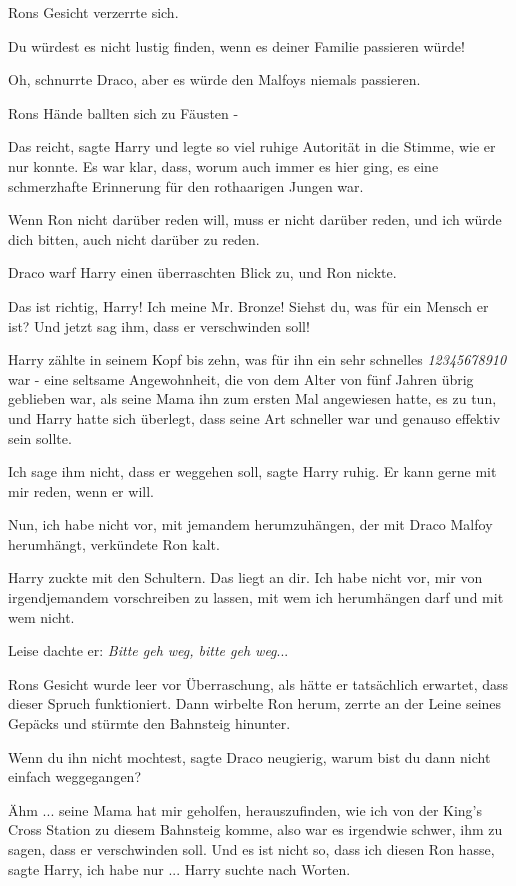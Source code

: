 Rons Gesicht verzerrte sich.

\glqq{}Du würdest es nicht lustig finden, wenn es deiner Familie passieren
würde!\grqq{}

\glqq{}Oh\grqq{}, schnurrte Draco, \glqq{}aber es würde den Malfoys niemals
passieren.\grqq{}

Rons Hände ballten sich zu Fäusten -

\glqq{}Das reicht\grqq{}, sagte Harry und legte so viel ruhige Autorität in die
Stimme, wie er nur konnte. Es war klar, dass, worum auch immer es hier ging, es
eine schmerzhafte Erinnerung für den rothaarigen Jungen war.

\glqq{}Wenn Ron nicht darüber reden will, muss er nicht darüber reden, und ich
würde dich bitten, auch nicht darüber zu reden.\grqq{}

Draco warf Harry einen überraschten Blick zu, und Ron nickte.

\glqq{}Das ist richtig, Harry! Ich meine Mr. Bronze! Siehst du, was für ein
Mensch er ist? Und jetzt sag ihm, dass er verschwinden soll!\grqq{}

Harry zählte in seinem Kopf bis zehn, was für ihn ein sehr schnelles
\emph{12345678910} war - eine seltsame Angewohnheit, die von dem Alter von fünf
Jahren übrig geblieben war, als seine Mama ihn zum ersten Mal angewiesen
hatte, es zu tun, und Harry hatte sich überlegt, dass seine Art schneller war
und genauso effektiv sein sollte.

\glqq{}Ich sage ihm nicht, dass er weggehen soll\grqq{}, sagte Harry ruhig.
\glqq{}Er kann gerne mit mir reden, wenn er will.\grqq{}

\glqq{}Nun, ich habe nicht vor, mit jemandem herumzuhängen, der mit Draco Malfoy
herumhängt\grqq{}, verkündete Ron kalt.

Harry zuckte mit den Schultern. \glqq{}Das liegt an dir. Ich habe nicht vor, mir
von irgendjemandem vorschreiben zu lassen, mit wem ich herumhängen darf und mit
wem nicht.\grqq{}

Leise dachte er: \emph{Bitte geh weg, bitte geh weg}...

Rons Gesicht wurde leer vor Überraschung, als hätte er tatsächlich erwartet,
dass dieser Spruch funktioniert. Dann wirbelte Ron herum, zerrte an der Leine
seines Gepäcks und stürmte den Bahnsteig hinunter.

\glqq{}Wenn du ihn nicht mochtest\grqq{}, sagte Draco neugierig, \glqq{}warum
bist du dann nicht einfach weggegangen?\grqq{}

\glqq{}Ähm ... seine Mama hat mir geholfen, herauszufinden, wie ich von der
King's Cross Station zu diesem Bahnsteig komme, also war es irgendwie schwer,
ihm zu sagen, dass er verschwinden soll. Und es ist nicht so, dass ich diesen
Ron hasse\grqq{}, sagte Harry, \glqq{}ich habe nur ...\grqq{} Harry suchte nach
Worten.


